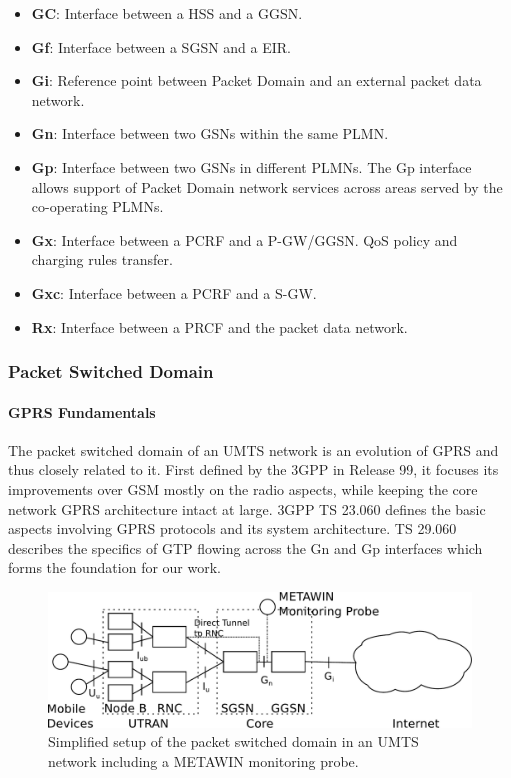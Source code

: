 \begin{itemize}
\item \textbf{GC}: Interface between a HSS and a GGSN.
\item \textbf{Gf}: Interface between a SGSN and a EIR.
\item \textbf{Gi}: Reference point between Packet Domain and an external packet data network.
\item \textbf{Gn}: Interface between two GSNs within the same PLMN.
\item \textbf{Gp}: Interface between two GSNs in different PLMNs. The Gp interface allows support of Packet Domain network services across areas served by the co-operating PLMNs.
\item \textbf{Gx}: Interface between a PCRF and a P-GW/GGSN. QoS policy and charging rules transfer.
\item \textbf{Gxc}: Interface between a PCRF and a S-GW.

\item \textbf{Rx}: Interface between a PRCF and the packet data network.
\end{itemize}


\subsubsection{Packet Switched Domain}



\paragraph{GPRS Fundamentals}

The packet switched domain of an \gls{UMTS} network is an evolution of \gls{GPRS} and thus closely related to it. First defined by the \gls{3GPP} in Release 99, it focuses its improvements over \gls{GSM} mostly on the radio aspects, while keeping the core network \gls{GPRS} architecture intact at large. \gls{3GPP} \gls{TS} 23.060 \cite{3gpp23.060} defines the basic aspects involving \gls{GPRS} protocols and its system architecture. \gls{TS} 29.060 \cite{3gpp29.060} describes the specifics of \gls{GTP} flowing across the Gn and Gp interfaces which forms the foundation for our work.

\begin{figure}[htb]
	\centering
	\includegraphics[width=1.0\textwidth]{images/umts-network.pdf}
	\caption{Simplified setup of the packet switched domain in an \acrshort{UMTS} network including a METAWIN monitoring probe.}
	\label{c4:fig:umtsnetwork}
\end{figure}

